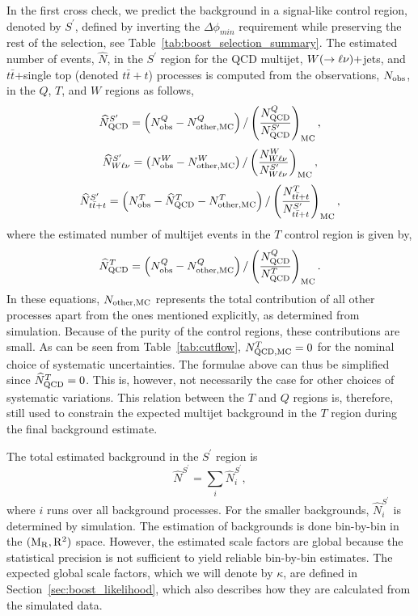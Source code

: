 In the first cross check, we predict the background in a signal-like control region, denoted by
$S^\prime$, defined by inverting the $\Delta\phi_{min}$ requirement while preserving the rest of the
selection, see Table~\ref{tab:boost_selection_summary}. 
The estimated number of events, $\widehat{N}$, in the $S^\prime$ region for the QCD multijet,
$W(\rightarrow \ell\nu)+$jets, and $t\bar{t}$+single top (denoted $t\bar{t}+t$) processes is
computed from the observations, $N_{\rm obs}$, in the $Q$, $T$, and $W$ regions as follows,
\begin{equation}
 \widehat{N}_{\rm QCD}^{S^\prime} = \left( N_{\rm obs}^{Q} - N_{{\rm other, MC}}^{Q} \right)  /
\left(
\frac{N_{\rm QCD}^{Q}}{N_{\rm QCD}^{S^\prime}} \right)_{\rm MC},
\label{eq:E1}
\end{equation}
\begin{equation}
 \widehat{N}_{W\ell\nu}^{S^\prime} = \left( N_{\rm obs}^{W} - N_{\rm other, MC}^{W} \right) /
\left(
\frac{N_{W\ell\nu}^{W}}{N_{W\ell\nu}^{S^\prime}} \right)_{\rm MC},
\label{eq:E2}
\end{equation}
\begin{equation}
  \widehat{N}_{t\bar{t}+t}^{S^\prime} = \left( N_{\rm obs}^{T} - \widehat{N}_{\rm QCD}^{T} - N_{\rm
other, MC}^{T}
\right) / \left( \frac{N_{t\bar{t}+t}^{T}} {N_{t\bar{t}+t}^{S^\prime}}\right)_{\rm MC},
\label{eq:E3}
\end{equation}
where the estimated number of multijet events in the $T$ control region is given by,
\begin{equation}
 \widehat{N}_{\rm QCD}^{T} = \left( N_{\rm obs}^{Q} - N_{\rm other, MC}^{Q} \right) /  \left(
\frac{N_{\rm QCD}^{Q}}{N_{\rm QCD}^{T}} \right)_{\rm MC}.
\label{eq:E4}
\end{equation}
In these equations, $N_{\rm other, MC}$ represents the total contribution of all other processes
apart from the ones mentioned explicitly, as determined from simulation. Because of the purity
of the control regions, these contributions are small. 
As can be seen from Table~\ref{tab:cutflow}, $N_{\rm QCD, MC}^{T} = 0$ for the nominal choice
of systematic uncertainties. The formulae above can thus be simplified since $\widehat{N}_{\rm
QCD}^{T} = 0$. This is, however, not necessarily the case for other choices of systematic
variations.
This relation between the $T$ and $Q$ regions is, therefore, still used to constrain the expected
multijet background in the $T$ region during the final background estimate. 

The total estimated background in the $S^\prime$ region is
\begin{equation}
  \hat{N}^{S^\prime} = \sum_i \hat{N}^{S^\prime}_i , 
\end{equation}
where $i$ runs over all background processes.  For the smaller backgrounds, $\hat{N}^{S^\prime}_i$
is determined by simulation. 
The estimation of backgrounds is done bin-by-bin in the $(\mathrm{M_R},\mathrm{R^2})$ space. 
However, the estimated scale factors are global because the statistical precision is not sufficient
to yield reliable bin-by-bin estimates. The expected global scale factors, which we will denote by
$\kappa$,  are defined in Section~\ref{sec:boost_likelihood}, which also describes how they are
calculated from the simulated data.

